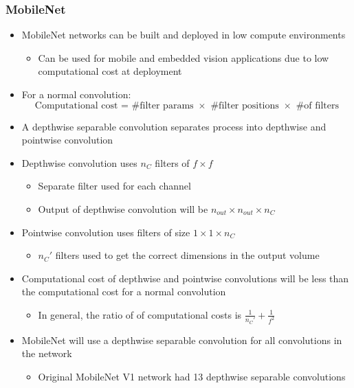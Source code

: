 \documentclass[12pt, letterpaper]{article}
\begin{document}
    \subsubsection{MobileNet}
    \begin{itemize}
        \item MobileNet networks can be built and deployed in low compute environments 
        \begin{itemize}
            \item Can be used for mobile and embedded vision applications due to low computational cost at deployment
        \end{itemize}
        \item For a normal convolution:
        $$\text{Computational cost = \# filter params $\times$ \# filter positions $\times$ \# of filters}$$
        \item A depthwise separable convolution separates process into depthwise and pointwise convolution
        \item Depthwise convolution uses $n_C$ filters of $f\times f$
        \begin{itemize}
            \item Separate filter used for each channel
            \item Output of depthwise convolution will be $n_{out}\times n_{out}\times n_C$
        \end{itemize}
        \item Pointwise convolution uses filters of size $1\times 1\times n_C$
        \begin{itemize}
            \item ${n_C}'$ filters used to get the correct dimensions in the output volume
        \end{itemize}
        \item Computational cost of depthwise and pointwise convolutions will be less than the computational cost for a normal convolution
        \begin{itemize}
            \item In general, the ratio of of computational costs is $\frac{1}{{n_C}'}+\frac{1}{f^2}$
        \end{itemize}
        \item MobileNet will use a depthwise separable convolution for all convolutions in the network
        \begin{itemize}
            \item Original MobileNet V1 network had 13 depthwise separable convolutions

\end{itemize}
\end{itemize}
\end{document}
